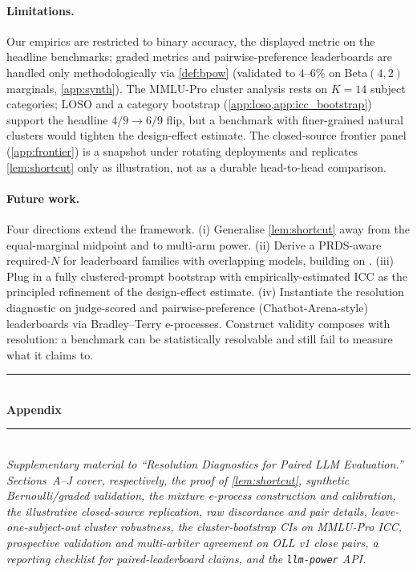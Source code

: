 \documentclass{article}
\theoremstyle{plain}
\theoremstyle{definition}
\begin{document}
\paragraph{Limitations.} Our empirics are restricted to binary accuracy, the displayed metric on the headline benchmarks; graded metrics and pairwise-preference leaderboards are handled only methodologically via \cref{def:bpow} (validated to $4$--$6\%$ on Beta$(4,2)$ marginals, \cref{app:synth}). The MMLU-Pro cluster analysis rests on $K{=}14$ subject categories; LOSO and a category bootstrap (\cref{app:loso,app:icc_bootstrap}) support the headline $4/9 \to 6/9$ flip, but a benchmark with finer-grained natural clusters would tighten the design-effect estimate. The closed-source frontier panel (\cref{app:frontier}) is a snapshot under rotating deployments and replicates \cref{lem:shortcut} only as illustration, not as a durable head-to-head comparison.

\paragraph{Future work.} Four directions extend the framework. (i) Generalise \cref{lem:shortcut} away from the equal-marginal midpoint and to multi-arm power. (ii) Derive a PRDS-aware required-$N$ for leaderboard families with overlapping models, building on \citet{benjamini2001control}. (iii) Plug in a fully clustered-prompt bootstrap with empirically-estimated ICC \citep{jo2025whatdoes} as the principled refinement of the design-effect estimate. (iv) Instantiate the resolution diagnostic on judge-scored and pairwise-preference (Chatbot-Arena-style) leaderboards via Bradley--Terry e-processes. Construct validity \citep{freiesleben2025epistemology,bean2025matters,alaa2025medical} composes with resolution: a benchmark can be statistically resolvable and still fail to measure what it claims to.




\clearpage
\appendix
\onecolumn

\begin{center}
\noindent\rule{\linewidth}{0.6pt}\\[2pt]
{\large\bfseries Appendix}\\[2pt]
\noindent\rule{\linewidth}{0.6pt}\\[6pt]
\textit{Supplementary material to ``Resolution Diagnostics for Paired LLM Evaluation.''
Sections~A--J cover, respectively, the proof of \cref{lem:shortcut}, synthetic Bernoulli/graded validation, the mixture e-process construction and calibration, the illustrative closed-source replication, raw discordance and pair details, leave-one-subject-out cluster robustness, the cluster-bootstrap CIs on MMLU-Pro ICC, prospective validation and multi-arbiter agreement on OLL v1 close pairs, a reporting checklist for paired-leaderboard claims, and the \texttt{llm-power} API.}
\end{center}
\vskip 0.3in
\end{document}
